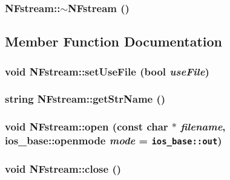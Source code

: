 \subsubsection{\setlength{\rightskip}{0pt plus 5cm}NFstream::$\sim$NFstream ()}\label{classNFstream_22f1f040c1d6cf8ed854ddd17a7c6b51}




\subsection{Member Function Documentation}
\subsubsection{\setlength{\rightskip}{0pt plus 5cm}void NFstream::setUseFile (bool {\em useFile})}\label{classNFstream_29e598e0fa90502294ac63d767f4bc86}


\subsubsection{\setlength{\rightskip}{0pt plus 5cm}string NFstream::getStrName ()}\label{classNFstream_13d211178aa168daf01c058d2fe85c15}


\subsubsection{\setlength{\rightskip}{0pt plus 5cm}void NFstream::open (const char $\ast$ {\em filename}, ios\_\-base::openmode {\em mode} = {\tt ios\_\-base::out})}\label{classNFstream_2e8126bddf568a46eb14a0e100dfcd50}


\subsubsection{\setlength{\rightskip}{0pt plus 5cm}void NFstream::close ()}\label{classNFstream_3f953a4db13a9c1888d81870c411c0b8}


